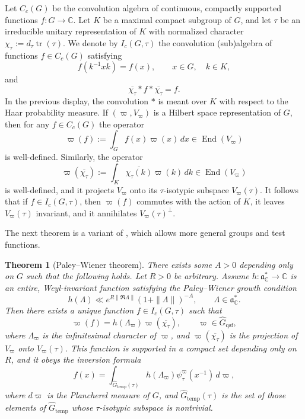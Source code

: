 \documentclass[11pt,oneside]{amsart}
\numberwithin{equation}{section}
\theoremstyle{remark}
\theoremstyle{plain}
\newtheorem{theorem}{Theorem}
\DeclareMathOperator{\tr}{tr}
\DeclareMathOperator{\End}{End}
\newcommand\CC{\mathbb{C}}
\newcommand\mfa{\mathfrak{a}}
\newcommand\ov{\overline}
\newcommand\Gtemp{\widehat{G}_\mathrm{temp}}
\newcommand\Gqsf{\widehat{G}_\mathrm{qsf}}
\begin{document}
Let $C_c(G)$ be the convolution algebra of continuous, compactly supported functions $f:G\to\CC$. Let $K$ be a maximal compact subgroup of $G$, and let $\tau$ be an irreducible unitary representation of $K$ with normalized character $\chi_{\tau}:=d_{\tau}\tr(\tau)$. We denote by $I_c(G,\tau)$ the convolution (sub)algebra of functions $f\in C_c(G)$ satisfying
\begin{equation}\label{fprop1}
f(k^{-1}xk)=f(x),\qquad x\in G,\quad k\in K,
\end{equation}
and
\begin{equation}\label{fprop2}
\ov{\chi_{\tau}} * f * \ov{\chi_{\tau}} = f.
\end{equation}
In the previous display, the convolution $*$ is meant over $K$ with respect to the Haar probability measure. If $(\varpi,V_\varpi)$ is a Hilbert space representation of $G$, then for any $f\in C_c(G)$ the operator
\[
\varpi(f):=\int_G f(x)\varpi(x)\,dx\in\End(V_{\varpi})
\]
is well-defined. Similarly, the operator
\[
\varpi(\ov{\chi_\tau}):=\int_K \ov{\chi_\tau(k)}\varpi(k)\,dk\in\End(V_{\varpi})
\]
is well-defined, and it projects $V_\varpi$ onto its $\tau$-isotypic subspace $V_\varpi(\tau)$. It follows that if $f\in I_c(G,\tau)$, then $\varpi(f)$ commutes with the action of $K$, it leaves $V_\varpi(\tau)$ invariant, and it annihilates $V_\varpi(\tau)^\perp$.

The next theorem is a variant of \cite[Th.~2]{DFJ}, which allows more general groups and test functions.

\begin{theorem}[Paley--Wiener theorem]\label{Thm5} There exists some $A>0$ depending only on $G$ such that the following holds. Let $R>0$ be arbitrary. Assume $h:\mfa^*_{\CC}\to\CC$ is an entire, Weyl-invariant function satisfying the Paley--Wiener growth condition
\[
h(\Lambda)\ll e^{R\|\Re\Lambda\|} (1+\|\Lambda\|)^{-A},\qquad\Lambda\in\mfa^*_\CC.
\]
Then there exists a unique function $f\in I_c(G,\tau)$ such that
\begin{equation}\label{scalarvalue}
\varpi(f)=h(\Lambda_{\varpi}) \varpi(\ov{\chi_{\tau}}),\qquad \varpi\in\Gqsf,
\end{equation}
where $\Lambda_{\varpi}$ is the infinitesimal character of $\varpi$, and $\varpi(\ov{\chi_{\tau}})$ is the projection of $V_{\varpi}$ onto $V_{\varpi}(\tau)$. This function is supported in a compact set depending only on $R$, and it obeys the inversion formula
\begin{equation}\label{inversion}
f(x)=\int_{\Gtemp(\tau)} h(\Lambda_{\varpi}) \psi_{\tau}^{\varpi}(x^{-1})\,d\varpi,
\end{equation}
where $d\varpi$ is the Plancherel measure of $G$, and $\Gtemp(\tau)$ is the set of those elements of $\Gtemp$ whose $\tau$-isotypic subspace is nontrivial.
\end{theorem}
\end{document}
